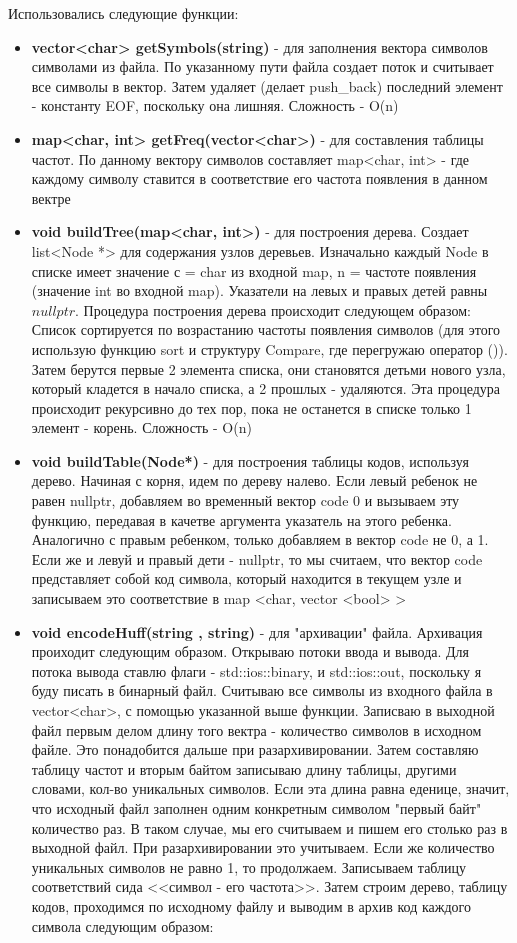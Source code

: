 \documentclass[a4paper, 12pt]{article}
\begin{document}
Использовались следующие функции:
\begin{itemize}
  \item \textbf{vector<char> getSymbols(string)} - для заполнения вектора
  символов символами из файла.
  По указанному пути файла создает поток и считывает все символы в вектор.
  Затем удаляет (делает push\_back) последний элемент - константу EOF,
  поскольку она лишняя. Сложность - O(n)
  \item \textbf{map<char, int> getFreq(vector<char>)} - для составления таблицы частот.
  По данному вектору символов составляет map<char, int> - где каждому символу ставится
  в соответствие его частота появления в данном вектре
  \item \textbf{void buildTree(map<char, int>)} - для построения дерева.
  Создает list<Node *> для содержания узлов деревьев. Изначально каждый Node
  в списке имеет значение с = char из входной map, n = частоте появления (значение int во входной map).
  Указатели на левых и правых детей равны $nullptr$. Процедура построения дерева происходит следующем образом:
  Список сортируется по возрастанию частоты появления символов (для этого использую
  функцию sort и структуру Compare, где перегружаю оператор ()).
  Затем берутся первые 2 элемента списка, они становятся детьми нового узла,
  который кладется в начало списка, а 2 прошлых - удаляются. Эта процедура происходит
  рекурсивно до тех пор, пока не останется в списке только 1 элемент - корень. Сложность - O(n)
  \item \textbf{void buildTable(Node*)} - для построения таблицы кодов, используя
  дерево. Начиная с корня, идем по дереву налево. Если
  левый ребенок не равен nullptr, добавляем во временный вектор code 0 и
  вызываем эту функцию, передавая в качетве аргумента указатель на этого ребенка.
  Аналогично с правым ребенком, только добавляем в вектор code не 0, а 1. Если же
  и левуй и правый дети - nullptr, то мы считаем, что вектор code представляет собой
  код символа, который находится в текущем узле и записываем это соответствие в map <char, vector <bool> >
  \item \textbf{void encodeHuff(string , string)} - для "архивации" файла.
  Архивация проиходит следующим образом. Открываю потоки ввода
  и вывода. Для потока вывода ставлю флаги - std::ios::binary, и std::ios::out,
  поскольку я буду писать в бинарный файл. Считываю все символы из входного файла
  в vector<char>, с помощью указанной выше функции. Записваю в выходной файл первым делом
  длину того вектра - количество символов в исходном файле. Это понадобится
  дальше при разархивировании. Затем составляю таблицу
  частот и вторым байтом записываю длину таблицы, другими словами, кол-во
  уникальных символов. Если эта длина равна еденице, значит,
  что исходный файл заполнен одним конкретным символом "первый байт" количество
  раз. В таком случае, мы его считываем и пишем его столько раз в выходной файл.
  При разархивировании это учитываем. Если же количество
  уникальных символов не равно 1, то продолжаем. Записываем таблицу соответствий
  сида <<символ - его частота>>. Затем строим дерево, таблицу кодов,
  проходимся по исходному файлу и выводим в архив
  код каждого символа следующим образом:


\end{itemize}
\end{document}
